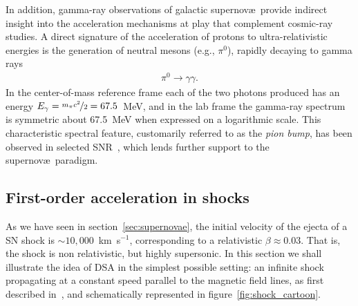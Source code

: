 In addition, gamma-ray observations of galactic supernov\ae\ provide indirect insight
into the acceleration mechanisms at play that complement cosmic-ray studies.
A direct signature of the acceleration of protons to ultra-relativistic energies
is the generation of neutral mesons (e.g., $\pi^0$), rapidly decaying to gamma rays
\begin{align*}
  \pi^0 \rightarrow \gamma \gamma.
\end{align*}
In the center-of-mass reference frame each of the two photons produced has an
energy $E_\gamma = \nicefrac{m_\pi c^2}{2} = 67.5$~MeV, and in the lab frame the
gamma-ray spectrum is symmetric about 67.5~MeV when expressed on a logarithmic
scale. This characteristic spectral feature, customarily referred to as the
\emph{pion bump}, has been observed in selected SNR~\cite{2013Sci...339..807A},
which lends further support to the supernov\ae~paradigm.



\subsection{First-order acceleration in shocks}\label{sec:shock_acceleration}

As we have seen in section~\ref{sec:supernovae}, the initial velocity of the ejecta
of a SN shock is $\sim 10,000$~km~s$^{-1}$, corresponding to a relativistic
$\beta \approx 0.03$. That is, the shock is non relativistic, but highly
supersonic.
In this section we shall illustrate the idea of DSA in the simplest possible setting:
an infinite shock propagating at a constant speed parallel to the magnetic field
lines, as first described in~\cite{1978MNRAS.182..147B}, and schematically represented
in figure~\ref{fig:shock_cartoon}.

\begin{marginfigure}
  
  \caption{Schematic view of a parallel shock in the reference frame where the
  interstellar gas is at rest, and the shock front is moving with velocity $\beta c$
  along the $x$ axis.}
  \label{fig:shock_cartoon}
\end{marginfigure}

